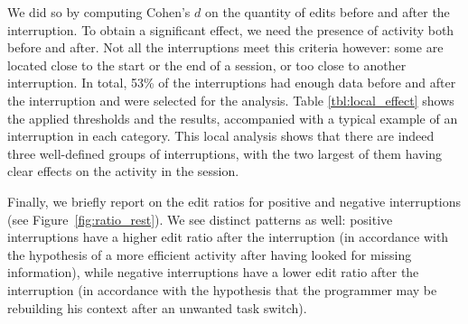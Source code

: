 \documentclass[conference]{IEEEtran}
\begin{document}
We did so by computing Cohen's $d$ on the quantity of edits before and after the interruption. To obtain a significant effect, we need the presence of activity both before and after. Not all the interruptions meet this criteria however: some are located close to the start or the end of a session, or too close to another interruption.  In total, 53\% of the interruptions had enough data before and after the interruption and were selected for the analysis. %
Table \ref{tbl:local_effect} shows the applied thresholds and the results, accompanied with a typical example of an interruption in each category. This local analysis shows that there are indeed three well-defined groups of interruptions, with the two largest of them having clear effects on the activity in the session.

Finally, we briefly report on the edit ratios for positive and negative interruptions (see Figure~\ref{fig:ratio_rest}). We see distinct patterns as well: positive interruptions have a higher edit ratio after the interruption (in accordance with the hypothesis of a more efficient activity after having looked for missing information), while negative interruptions have a lower edit ratio after the interruption (in accordance with the hypothesis that the programmer may be rebuilding his context after an unwanted task switch).

\end{document}

